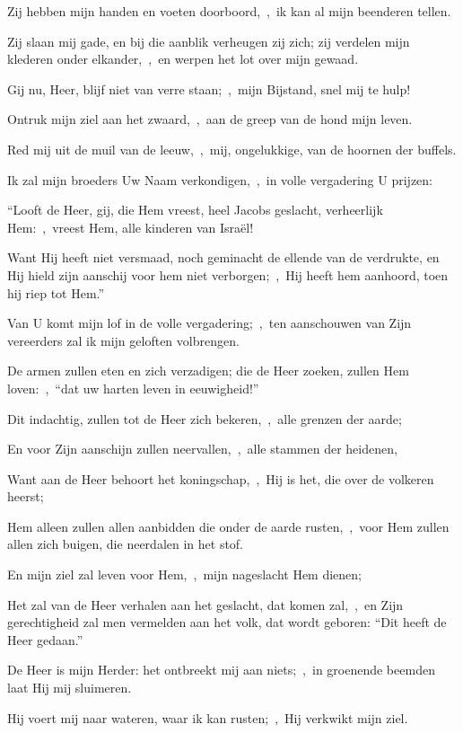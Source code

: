 \documentclass[12pt,twoside,a5paper]{article}
\begin{document}
\begin{halfparskip}
  Zij hebben mijn handen en voeten doorboord,~\sep\ ik kan al mijn beenderen tellen.

  Zij slaan mij gade, en bij die aanblik verheugen zij zich; zij verdelen mijn klederen onder elkander,~\sep\ en werpen het lot over mijn gewaad.

  Gij nu, Heer, blijf niet van verre staan;~\sep\ mijn Bijstand, snel mij te hulp!

  Ontruk mijn ziel aan het zwaard,~\sep\ aan de greep van de hond mijn leven.

  Red mij uit de muil van de leeuw,~\sep\ mij, ongelukkige, van de hoornen der buffels.

  Ik zal mijn broeders Uw Naam verkondigen,~\sep\ in volle vergadering U prijzen:

  ``Looft de Heer, gij, die Hem vreest, heel Jacobs geslacht, verheerlijk Hem:~\sep\ vreest Hem, alle kinderen van Israël!

  Want Hij heeft niet versmaad, noch geminacht de ellende van de verdrukte, en Hij hield zijn aanschij voor hem niet verborgen;~\sep\ Hij heeft hem aanhoord, toen hij riep tot Hem.''

  Van U komt mijn lof in de volle vergadering;~\sep\ ten aanschouwen van Zijn vereerders zal ik mijn geloften volbrengen.

  De armen zullen eten en zich verzadigen; die de Heer zoeken, zullen Hem loven:~\sep\ ``dat uw harten leven in eeuwigheid!''

  Dit indachtig, zullen tot de Heer zich bekeren,~\sep\ alle grenzen der aarde;

  En voor Zijn aanschijn zullen neervallen,~\sep\ alle stammen der heidenen,

  Want aan de Heer behoort het koningschap,~\sep\ Hij is het, die over de volkeren heerst;

  Hem alleen zullen allen aanbidden die onder de aarde rusten,~\sep\ voor Hem zullen allen zich buigen, die neerdalen in het stof.

  En mijn ziel zal leven voor Hem,~\sep\ mijn nageslacht Hem dienen;

  Het zal van de Heer verhalen aan het geslacht, dat komen zal,~\sep\ en Zijn gerechtigheid zal men vermelden aan het volk, dat wordt geboren: ``Dit heeft de Heer gedaan.''

   De Heer is mijn Herder: het ontbreekt mij aan niets;~\sep\ in groenende beemden laat Hij mij sluimeren.

  Hij voert mij naar wateren, waar ik kan rusten;~\sep\ Hij verkwikt mijn ziel.


\end{halfparskip}
\end{document}
